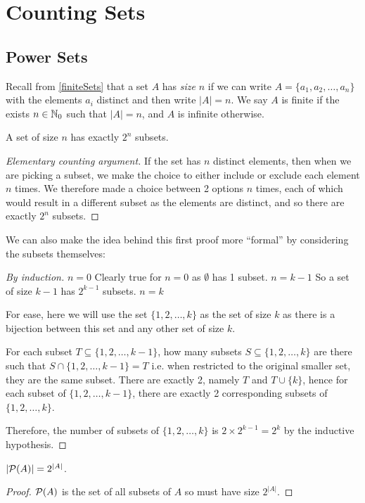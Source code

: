 \documentclass[../main.tex]{subfiles}
\begin{document}
\section{Counting Sets}
\subsection{Power Sets}
\begin{remark}[Reminder]
  Recall from \cref{finiteSets} that a set $A$ has \textit{size} $n$ if we can write $A = \{a_1, a_2, \ldots, a_n\}$ with the elements $a_i$ distinct and then write $|A| = n$.
  We say $A$ is finite if the exists $n \in \mathbb{N}_0$ such that $|A| = n$, and $A$ is infinite otherwise.
\end{remark}
\begin{proposition}
  A set of size $n$ has exactly $2^{n}$ subsets. \label{powerSetSize}
\end{proposition}
\begin{proof}[Elementary counting argument]
  If the set has $n$ distinct elements, then when we are picking a subset, we make the choice to either include or exclude each element $n$ times.
  We therefore made a choice between 2 options $n$ times, each of which would result in a different subset as the elements are distinct, and so there are exactly $2^{n}$ subsets.
\end{proof}
We can also make the idea behind this first proof more ``formal'' by considering the subsets themselves:
\begin{proof}[By induction]
  \induction
  {$n = 0$}{
    Clearly true for $n = 0$ as $\emptyset$ has 1 subset.
  }
  {$n = k - 1$}{
    So a set of size $k - 1$ has $2^{k - 1}$ subsets.
  }
  {$n = k$}{
    For ease, here we will use the set $\{1, 2, \ldots, k\}$ as the set of size $k$ as there is a bijection between this set and any other set of size $k$.

    For each subset $T \subseteq \{1, 2, \ldots, k - 1\}$, how many subsets $S \subseteq \{1, 2, \ldots, k\}$ are there such that $S \cap \{1, 2, \ldots, k - 1\} = T$ i.e. when restricted to the original smaller set, they are the same subset.
    There are exactly 2, namely $T$ and $T \cup \{k\}$, hence for each subset of $\{1, 2, \ldots, k - 1\}$, there are exactly 2 corresponding subsets of $\{1, 2, \ldots, k\}$.

    Therefore, the number of subsets of $\{1, 2, \ldots, k\}$ is $2 \times 2^{k - 1} = 2^{k}$ by the inductive hypothesis.
  }
\end{proof}
\begin{corollary}
  $|\mathcal{P}(A)| = 2^{|A|}$.
\end{corollary}
\begin{proof}
  $\mathcal{P}(A)$ is the set of all subsets of $A$ so must have size $2^{|A|}$.
\end{proof}
\end{document}
